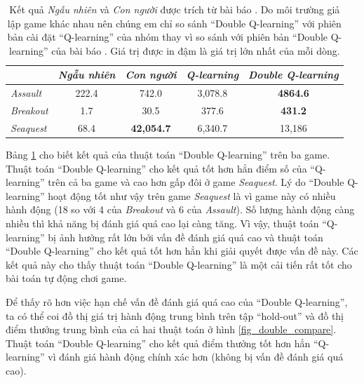 	\begin{table}
		\centering
		\caption[Điểm thưởng nhận được của thuật toán ``Double Q-learning'']{
		Kết quả \textit{Ngẫu nhiên} và \textit{Con người} được trích từ bài báo \cite{van2015deep}.
		Do môi trường giả lập game khác nhau nên chúng em chỉ so sánh ``Double Q-learning'' với phiên bản cài đặt ``Q-learning'' của nhóm thay vì so sánh với phiên bản ``Double Q-learning'' của bài báo \cite{van2015deep}.
		Giá trị được in đậm là giá trị lớn nhất của mỗi dòng.}
		\label{table_double_results}
		\begin{tabular}{| l | c | c | c | c |}
			\hline
			 & \textit{Ngẫu nhiên}\cite{mnihdqn2015} & \textit{Con người}\cite{mnihdqn2015} & \textit{Q-learning} & \textit{Double Q-learning} \\
			\hline \hline
			\textit{Assault} & 222.4 & 742.0 & 3,078.8 & \textbf{4864.6} \\
			\hline
			\textit{Breakout} & 1.7 & 30.5 & 377.6 & \textbf{431.2} \\
			\hline
			\textit{Seaquest} & 68.4 & \textbf{42,054.7} & 6,340.7 & 13,186 \\
			\hline
		\end{tabular}		
	\end{table}
	
	Bảng \ref{table_double_results} cho biết kết quả của thuật toán ``Double Q-learning'' trên ba game.
	Thuật toán ``Double Q-learning'' cho kết quả tốt hơn hẳn điểm số của ``Q-learning'' trên cả ba game và cao hơn gấp đôi ở game \textit{Seaquest}.
	Lý do ``Double Q-learning'' hoạt động tốt như vậy trên game \textit{Seaquest} là vì game này có nhiều hành động (18 so với 4 của \textit{Breakout} và 6 của \textit{Assault}).
	Số lượng hành động càng nhiều thì khả năng bị đánh giá quá cao lại càng tăng.
	Vì vậy, thuật toán ``Q-learning'' bị ảnh hưởng rất lớn bởi vấn đề đánh giá quá cao và thuật toán ``Double Q-learning'' cho kết quả tốt hơn hẳn khi giải quyết được vấn đề này.
	Các kết quả này cho thấy thuật toán ``Double Q-learning'' là một cải tiến rất tốt cho bài toán tự động chơi game.
	
	Để thấy rõ hơn việc hạn chế vấn đề đánh giá quá cao của ``Double Q-learning'', ta có thể coi đồ thị giá trị hành động trung bình trên tập ``hold-out'' và đồ thị điểm thưởng trung bình của cả hai thuật toán ở hình \ref{fig_double_compare}.
	Thuật toán ``Double Q-learning'' cho kết quả điểm thưởng tốt hơn hẳn ``Q-learning'' vì đánh giá hành động chính xác hơn (không bị vấn đề đánh giá quá cao).
	
